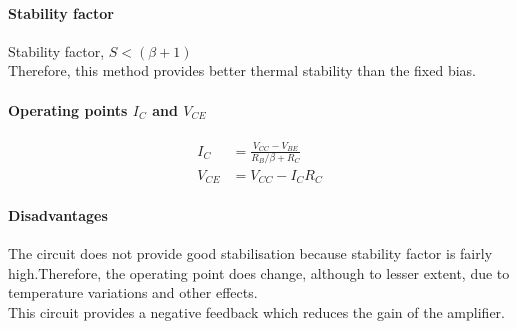    \paragraph{Stability factor}
   Stability factor, $S<(\beta+1)$\\
   Therefore, this method provides better thermal stability than the fixed bias.
   \paragraph{Operating points $I_C$ and $V_{CE}$}
   $$\begin{aligned}
   	I_{C} &=\frac{V_{C C}-V_{B E}}{R_{B} / \beta+R_{C}} \\
   	V_{C E} &=V_{C C}-I_{C} R_{C}
   \end{aligned}$$
   \paragraph{Disadvantages}
    The circuit does not provide good stabilisation because stability factor is fairly high.Therefore, the operating point does change, although to lesser extent, due to temperature variations and other effects.\\
    This circuit provides a negative feedback which reduces the gain of the amplifier.
